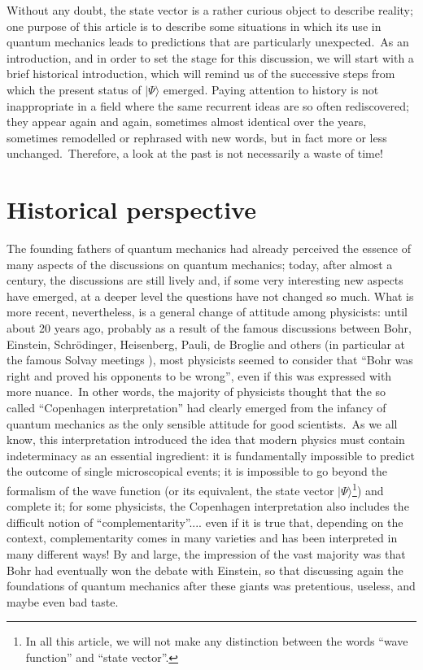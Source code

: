 \documentclass[12pt,onecolumn]{article}%
\begin{document}
Without any doubt, the state vector is a rather curious object to describe
reality; one purpose of this article is to describe some situations in which
its use in quantum mechanics leads to predictions that are particularly
unexpected.\ As an introduction, and in order to set the stage for this
discussion, we will start with a brief historical introduction, which will
remind us of the successive steps from which the present status of $|\Psi\rangle $
emerged. Paying attention to history is not inappropriate in a field where the
same recurrent ideas are so often rediscovered; they appear again and again,
sometimes almost identical over the years, sometimes remodelled or rephrased
with new words, but in fact more or less unchanged.\ Therefore, a look at the
past is not necessarily a waste of time!

\section{Historical perspective}

\label{historical}

The founding fathers of quantum mechanics had already perceived the essence of
many aspects of the discussions on quantum mechanics; today, after almost a
century, the discussions are still lively and, if some very interesting new
aspects have emerged, at a deeper level the questions have not changed so
much. What is more recent, nevertheless, is a general change of attitude among
physicists: until about 20 years ago, probably as a result of the famous
discussions between Bohr, Einstein, Schr\"{o}dinger, Heisenberg, Pauli, de
Broglie and others (in particular at the famous Solvay meetings \cite{Bohr}),
most physicists seemed to consider that ``Bohr was right and proved his
opponents to be wrong'', even if this was expressed with more nuance.\ In
other words, the majority of physicists thought that the so called
``Copenhagen interpretation'' had clearly emerged from the infancy of quantum
mechanics as the only sensible attitude for good scientists.\ As we all know,
this interpretation introduced the idea that modern physics must contain
indeterminacy as an essential ingredient: it is fundamentally impossible to
predict the outcome of single microscopical events; it is impossible to go
beyond the formalism of the wave function (or its equivalent, the state vector
$|\Psi\rangle $\footnote{In all this article, we will not make any distinction
between the words ``wave function'' and ``state vector''.}) and complete it;
for some physicists, the Copenhagen interpretation also includes the difficult
notion of ``complementarity''.... even if it is true that, depending on the
context, complementarity comes in many varieties and has been interpreted in
many different ways! By and large, the impression of the vast majority was
that Bohr had eventually won the debate with Einstein, so that discussing
again the foundations of quantum mechanics after these giants was pretentious,
useless, and maybe even bad taste.
\end{document}
